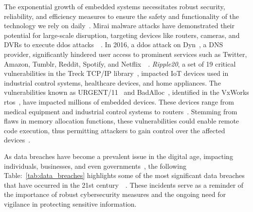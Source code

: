 The exponential growth of embedded systems necessitates robust security,
reliability, and efficiency measures to ensure the safety and functionality of
the technology we rely on daily~\cite{muench2018you}. Mirai malware attacks have
demonstrated their potential for large-scale disruption, targeting devices like
routers, cameras, and DVRs to execute \gls{ddos} attacks~\cite{KrebsOnS42:online}~\cite{antonakakis2017understanding}.
In 2016, a \acrshort{ddos} attack on Dyn~\cite{LargeDDo94:online}, a DNS provider, significantly
hindered user access to prominent services such as Twitter, Amazon, Tumblr, Reddit, Spotify, and
Netflix~\cite{muench2018you}~\cite{lindqvist2017future}. \textit{Ripple20},
a set of 19 critical vulnerabilities in the Treck TCP/IP library~\cite{TreckTCP63:online},
impacted IoT devices used in industrial control systems, healthcare devices,
and home appliances. The vulnerabilities known as URGENT/11~\cite{WhatisUR60:online}
and BadAlloc~\cite{IoTriddl27:online}, identified in the VxWorks
\gls{rtos}~\cite{VxWorksI53:online}, have impacted millions of embedded devices.
These devices range from medical equipment and industrial control systems to
routers~\cite{seri2019critical}. Stemming from flaws in memory allocation
functions, these vulnerabilities could enable remote code execution, thus
permitting attackers to gain control over the affected
devices~\cite{1NewMess42:online}.

As data breaches have become a prevalent issue in the digital age,
impacting individuals, businesses, and even governments~\cite{10oftheB31:online},
the following Table:~\ref{tab:data_breaches} highlights some of the most
significant data breaches that have occurred in
the 21st century~\cite{The15big77:online}~\cite{10oftheB31:online}.
These incidents serve as a reminder of the importance of robust
cybersecurity measures and the ongoing need for vigilance in
protecting sensitive information.


